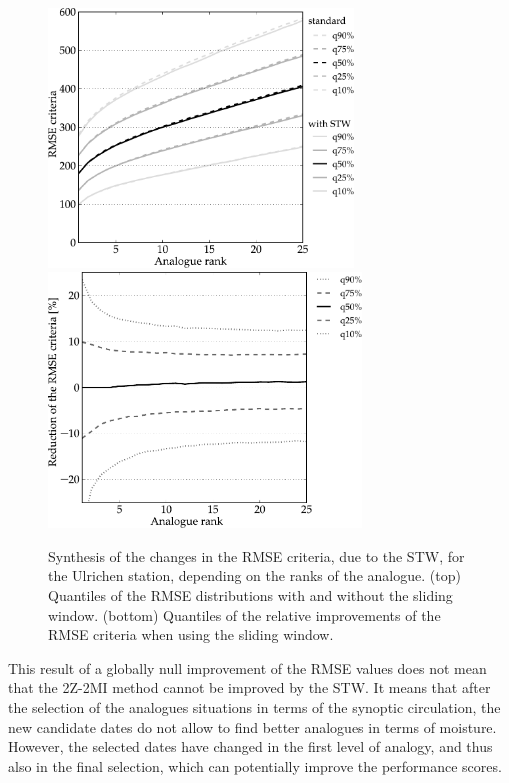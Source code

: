 \documentclass[hess]{copernicus}
\begin{document}
\begin{figure}[htb]
	\begin{center}
		\includegraphics[width=8.1cm]{figures/changes_RMSE_value.pdf} \\
		\includegraphics[width=8.3cm]{figures/changes_RMSE_gain.pdf}
	\end{center}
	\caption{Synthesis of the changes in the RMSE criteria, due to the STW, for the Ulrichen station, depending on the ranks of the analogue. (top) Quantiles of the RMSE distributions with and without the sliding window. (bottom) Quantiles of the relative improvements of the RMSE criteria when using the sliding window.}
	\label{fig:changes_RMSE}
\end{figure}

This result of a globally null improvement of the RMSE values does not mean that the 2Z-2MI method cannot be improved by the STW. It means that after the selection of the analogues situations in terms of the synoptic circulation, the new candidate dates do not allow to find better analogues in terms of moisture. However, the selected dates have changed in the first level of analogy, and thus also in the final selection, which can potentially improve the performance scores.
\end{document}
